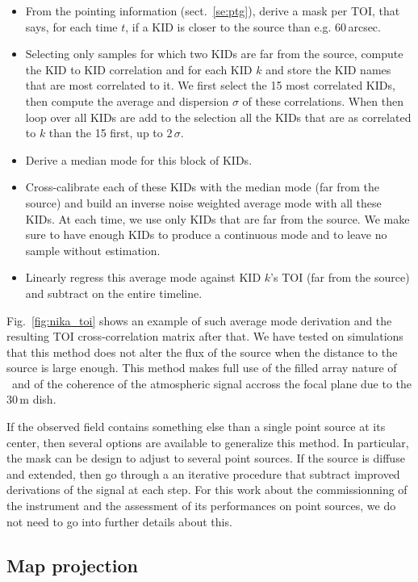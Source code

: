 \begin{itemize}
\item From the pointing information (sect.~\ref{se:ptg}), derive a mask per TOI,
  that says, for each time $t$, if a KID is closer to the source than
  e.g. 60\,arcsec.
\item Selecting only samples for which two KIDs are far from the source, compute
  the KID to KID correlation and for each KID $k$ and store the KID names that are most
  correlated to it. We first select the 15 most correlated KIDs, then compute
  the average and dispersion $\sigma$ of these correlations. When then loop over all KIDs
  are add to the selection all the KIDs that are as correlated to $k$ than the
  15 first, up to $2\,\sigma$.
\item Derive a median mode for this block of KIDs.
\item Cross-calibrate each of these KIDs with the median mode (far from the
  source) and build an inverse noise weighted average mode with all these
  KIDs. At each time, we use only KIDs that are far from the source. We make
  sure to have enough KIDs to produce a continuous mode and to leave no sample
  without estimation.
\item Linearly regress this average mode against KID $k$'s TOI (far from the
  source) and subtract on the entire timeline.
\end{itemize}

Fig.~\ref{fig:nika_toi} shows an example of such average mode derivation and the
resulting TOI cross-correlation matrix after that. We have tested on simulations
that this method does not alter the flux of the source when the distance to the
source is large enough. This method makes full use of the filled array nature of
\nika\ and of the coherence of the atmospheric signal accross the focal plane
due to the 30\,m dish.

If the observed field contains something else than a single point source at its
center, then several options are available to generalize this method. In
particular, the mask can be design to adjust to several point sources. If the
source is diffuse and extended, then go through a an iterative procedure that
subtract improved derivations of the signal at each step. For this work about
the commissionning of the instrument and the assessment of its performances on
point sources, we do not need to go into further details about this.

\subsection{Map projection}
\label{se:map_projection}

